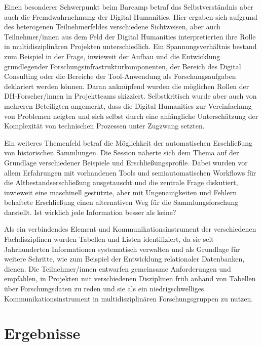 \documentclass[a4paper,
fontsize=11pt,
oneside,
numbers=noperiodatend,
parskip=half-,
bibliography=totoc,
final
]{scrartcl}
\begin{document}
Einen besonderer Schwerpunkt beim Barcamp betraf das Selbstverständnis
aber auch die Fremdwahrnehmung der Digital Humanities. Hier ergaben sich
aufgrund des heterogenen Teilnehmerfeldes verschiedene Sichtweisen, aber
auch Teilnehmer/innen aus dem Feld der Digital Humanities
interpretierten ihre Rolle in multidisziplinären Projekten
unterschiedlich. Ein Spannungsverhältnis bestand zum Beispiel in der
Frage, inwieweit der Aufbau und die Entwicklung grundlegender
Forschungsinfrastrukturkomponenten, der Bereich des Digital Consulting
oder die Bereiche der Tool-Anwendung als Forschungsaufgaben deklariert
werden können. Daran anknüpfend wurden die möglichen Rollen der
DH-Forscher/innen in Projektteams skizziert. Selbstkritisch wurde aber
auch von mehreren Beteiligten angemerkt, dass die Digital Humanities zur
Vereinfachung von Problemen neigten und sich selbst durch eine
anfängliche Unterschätzung der Komplexität von technischen Prozessen
unter Zugzwang setzten.

Ein weiteres Themenfeld betraf die Möglichkeit der automatischen
Erschließung von historischen Sammlungen. Die Session näherte sich dem
Thema auf der Grundlage verschiedener Beispiele und
Erschließungsprofile. Dabei wurden vor allem Erfahrungen mit vorhandenen
Tools und semiautomatischen Workflows für die Altbestandserschließung
ausgetauscht und die zentrale Frage diskutiert, inwieweit eine
maschinell gestützte, aber mit Ungenauigkeiten und Fehlern behaftete
Erschließung einen alternativen Weg für die Sammlungsforschung
darstellt. Ist wirklich jede Information besser als keine?

Als ein verbindendes Element und Kommunikationsinstrument der
verschiedenen Fachdisziplinen wurden Tabellen und Listen identifiziert,
da sie seit Jahrhunderten Informationen systematisch verwalten und als
Grundlage für weitere Schritte, wie zum Beispiel der Entwicklung
relationaler Datenbanken, dienen. Die Teilnehmer/innen entwarfen
gemeinsame Anforderungen und empfahlen, in Projekten mit verschiedenen
Disziplinen früh anhand von Tabellen über Forschungsdaten zu reden und
sie als ein niedrigschwelliges Kommunikationsinstrument in
multidisziplinären Forschungsgruppen zu nutzen.

\hypertarget{ergebnisse}{%
\section{Ergebnisse}\label{ergebnisse}}
\end{document}

